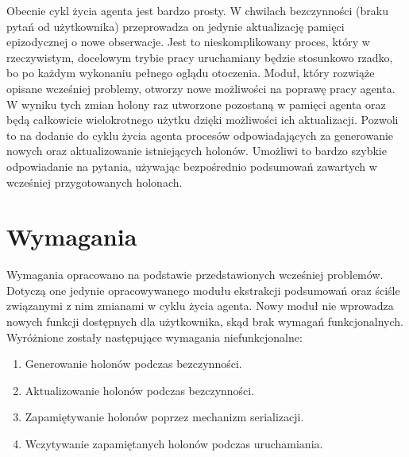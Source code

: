Obecnie cykl życia agenta jest bardzo prosty. W chwilach bezczynności (braku pytań od użytkownika) przeprowadza on jedynie aktualizację pamięci epizodycznej o nowe obserwacje. Jest to nieskomplikowany proces, który w rzeczywistym, docelowym trybie pracy uruchamiany będzie stosunkowo rzadko, bo po każdym wykonaniu pełnego oglądu otoczenia. Moduł, który rozwiąże opisane wcześniej problemy, otworzy nowe możliwości na poprawę pracy agenta. W wyniku tych zmian holony raz utworzone pozostaną w pamięci agenta oraz będą całkowicie wielokrotnego użytku dzięki możliwości ich aktualizacji. Pozwoli to na dodanie do cyklu życia agenta procesów odpowiadających za generowanie nowych oraz aktualizowanie istniejących holonów. Umożliwi to bardzo szybkie odpowiadanie na pytania, używając bezpośrednio podsumowań zawartych w wcześniej przygotowanych holonach.


\section{Wymagania}

Wymagania opracowano na podstawie przedstawionych wcześniej problemów. Dotyczą one jedynie opracowywanego modułu ekstrakcji podsumowań oraz ściśle związanymi z nim zmianami w cyklu życia agenta. Nowy moduł nie wprowadza nowych funkcji dostępnych dla użytkownika, skąd brak wymagań funkcjonalnych. Wyróżnione zostały następujące wymagania niefunkcjonalne:

\begin{enumerate}
	\setlength{\itemindent}{.5in}
	\item Generowanie holonów podczas bezczynności.
	\item Aktualizowanie holonów podczas bezczynności.
	\item Zapamiętywanie holonów poprzez mechanizm serializacji.
	\item Wczytywanie zapamiętanych holonów podczas uruchamiania.
\end{enumerate}  

